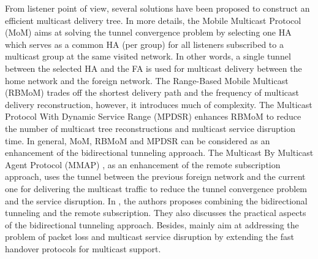 From listener point of view, several solutions \cite{MoM, RBMoM,MPDSR, MMA} have been proposed to construct an efficient multicast delivery tree. In more details, the Mobile Multicast Protocol (MoM) \cite{MoM} aims at solving the tunnel convergence problem by selecting one HA which serves as a common HA (per group) for all listeners subscribed to a multicast group at the same visited network. In other words, a single tunnel between the selected HA and the FA is used for multicast delivery between the home network and the foreign network. The Range-Based Mobile Multicast (RBMoM) \cite{RBMoM} trades off the shortest delivery path and the frequency of multicast delivery reconstruction, however, it introduces much of complexity. The Multicast Protocol With Dynamic Service Range (MPDSR) \cite{MPDSR} enhances RBMoM to reduce the number of multicast tree reconstructions and multicast service disruption time. In general, MoM, RBMoM and MPDSR can be considered as an enhancement of the bidirectional tunneling approach. The Multicast By Multicast Agent Protocol (MMAP) \cite{MMA}, as an enhancement of the remote subscription approach, uses the tunnel between the previous foreign network and the current one for delivering the multicast traffic to reduce the tunnel convergence problem and the service disruption. In \cite{multicast_ip_Jelger}, the authors proposes combining the bidirectional tunneling and the remote subscription. They also discusses the practical aspects of the bidirectional tunneling approach. Besides, \cite{seamless_multicast_MIPv6, FPMIPv6_multicast,fast_multicast_Kwon} mainly aim at addressing the problem of packet loss and multicast service disruption by extending the fast handover protocols for multicast support.  

